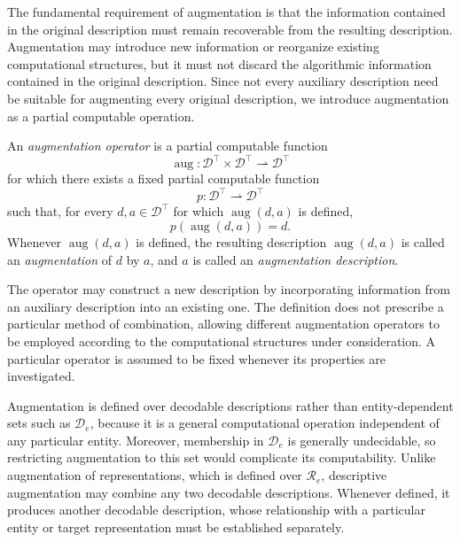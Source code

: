 The fundamental requirement of augmentation is that the information contained in the original description must remain recoverable from the resulting description. Augmentation may introduce new information or reorganize existing computational structures, but it must not discard the algorithmic information contained in the original description. Since not every auxiliary description need be suitable for augmenting every original description, we introduce augmentation as a partial computable operation.

\begin{definition}
\label{def:augmentation_descriptions}
\label{def:information_preserving_augmentation}
An \emph{augmentation operator} is a partial computable function
\[
\operatorname{aug}: \mathcal{D}^\top\times\mathcal{D}^\top \rightharpoonup\mathcal{D}^\top
\]
for which there exists a fixed partial computable function
\[
p:\mathcal{D}^\top\rightharpoonup\mathcal{D}^\top
\]
such that, for every $d,a\in\mathcal{D}^\top$ for which $\operatorname{aug}(d,a)$ is defined,
\[
p(\operatorname{aug}(d,a))=d.
\]
Whenever $\operatorname{aug}(d,a)$ is defined, the resulting description $\operatorname{aug}(d,a)$ is called an \emph{augmentation} of $d$ by $a$, and $a$ is called an \emph{augmentation description}.
\end{definition}

The operator may construct a new description by incorporating information from an auxiliary description into an existing one. The definition does not prescribe a particular method of combination, allowing different augmentation operators to be employed according to the computational structures under consideration. A particular operator is assumed to be fixed whenever its properties are investigated.

Augmentation is defined over decodable descriptions rather than entity-dependent sets such as $\mathcal D_e$, because it is a general computational operation independent of any particular entity. Moreover, membership in $\mathcal D_e$ is generally undecidable, so restricting augmentation to this set would complicate its computability. Unlike augmentation of representations, which is defined over $\mathcal{R}_{e}$, descriptive augmentation may combine any two decodable descriptions. Whenever defined, it produces another decodable description, whose relationship with a particular entity or target representation must be established separately.

